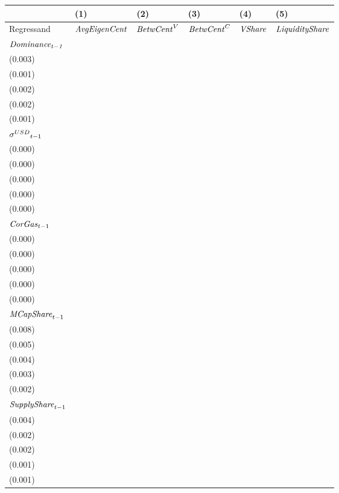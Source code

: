 \begin{tabular}{llllll}
\toprule
{} &                                  (1) &                                  (2) &                                   (3) &                                  (4) &                                   (5) \\
\midrule
Regressand                   &                 ${\it AvgEigenCent}$ &                   ${\it BetwCent}^V$ &                    ${\it BetwCent}^C$ &                       ${\it VShare}$ &                ${\it LiquidityShare}$ \\
$\it Dominance_{t-1}$        &  \makecell{$0.814^{***}$ \\ (0.003)} &  \makecell{$0.959^{***}$ \\ (0.001)} &   \makecell{$0.945^{***}$ \\ (0.002)} &  \makecell{$0.895^{***}$ \\ (0.002)} &   \makecell{$0.953^{***}$ \\ (0.001)} \\
${{\it \sigma}^{USD}}_{t-1}$ &    \makecell{$-0.000^{}$ \\ (0.000)} &     \makecell{$0.000^{}$ \\ (0.000)} &      \makecell{$0.000^{}$ \\ (0.000)} &    \makecell{$-0.000^{}$ \\ (0.000)} &     \makecell{$-0.000^{}$ \\ (0.000)} \\
${{\it CorGas}}_{t-1}$       &    \makecell{$-0.000^{}$ \\ (0.000)} &    \makecell{$-0.000^{}$ \\ (0.000)} &     \makecell{$-0.000^{}$ \\ (0.000)} &    \makecell{$-0.000^{}$ \\ (0.000)} &      \makecell{$0.000^{}$ \\ (0.000)} \\
${{\it MCapShare}}_{t-1}$    &    \makecell{$-0.011^{}$ \\ (0.008)} &  \makecell{$0.047^{***}$ \\ (0.005)} &   \makecell{$0.054^{***}$ \\ (0.004)} &  \makecell{$0.034^{***}$ \\ (0.003)} &   \makecell{$0.026^{***}$ \\ (0.002)} \\
${{\it SupplyShare}}_{t-1}$  &  \makecell{$0.054^{***}$ \\ (0.004)} &    \makecell{$-0.001^{}$ \\ (0.002)} &  \makecell{$-0.008^{***}$ \\ (0.002)} &  \makecell{$0.014^{***}$ \\ (0.001)} &  \makecell{$-0.012^{***}$ \\ (0.001)} \\

\end{tabular}
